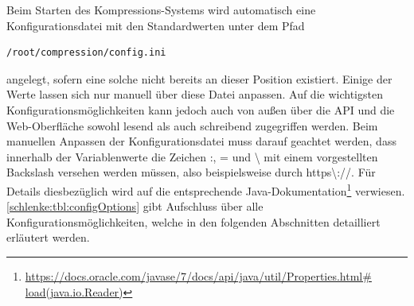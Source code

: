 Beim Starten des Kompressions-Systems wird automatisch eine Konfigurationsdatei mit den Standardwerten  unter dem Pfad
\begin{lstlisting}
/root/compression/config.ini
\end{lstlisting} 
angelegt, sofern eine solche nicht bereits an dieser Position existiert. Einige der Werte lassen sich nur manuell über diese Datei anpassen. Auf die wichtigsten Konfigurationsmöglichkeiten kann jedoch auch von außen über die API und die Web-Oberfläche sowohl lesend als auch schreibend zugegriffen werden. Beim manuellen Anpassen der Konfigurationsdatei muss darauf geachtet werden, dass innerhalb der Variablenwerte die Zeichen \glqq{}:\grqq{}, \glqq{}=\grqq{} und \glqq{}\textbackslash\grqq{} mit einem vorgestellten Backslash versehen werden müssen, also beispielsweise durch \glqq{}https\textbackslash ://\grqq{}. Für Details diesbezüglich wird auf die entsprechende Java-Dokumentation\footnote{\url{https://docs.oracle.com/javase/7/docs/api/java/util/Properties.html\# load(java.io.Reader)}} verwiesen. \autoref{schlenke:tbl:configOptions} gibt Aufschluss über alle Konfigurationsmöglichkeiten, welche in den folgenden Abschnitten detailliert erläutert werden.

